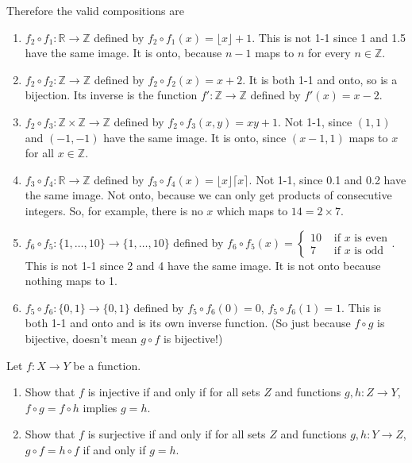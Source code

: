 \documentclass[11pt,dvipsnames]{book}
\def\R{\mathbb{R}}
\def\Z{\mathbb{Z}}
\numberwithin{figure}{section} %
\numberwithin{table}{section} %
\begin{document}
\begin{exercise}
\begin{solution}
Therefore the valid compositions are
\begin{enumerate}[label=(\alph*)]
 \item $f_2 \circ f_1 \colon \R \to \Z$ defined by $f_2 \circ f_1(x) = \lfloor x \rfloor + 1$. This is not 1-1 since 1 and 1.5 have the same image. It is onto, because $n-1$ maps to $n$ for every $n \in \Z$.
\item $f_2 \circ f_2 \colon \Z \to\Z$ defined by $f_2 \circ f_2(x) = x+2$. It is both 1-1 and onto, so is a bijection. Its inverse is the function $f'\colon \Z \to \Z$ defined by $f'(x) = x-2$.
 \item $f_2 \circ f_3 \colon \Z \times \Z \to \Z$ defined by $f_2 \circ f_3(x,y) = xy+1$. Not 1-1, since $(1,1)$ and $(-1,-1)$ have the same image. It is onto, since $(x-1,1)$ maps to $x$ for all $x \in \Z$.
 \item $f_3 \circ f_4 \colon \R \to \Z$ defined by $f_3 \circ f_4 (x) = \lfloor x \rfloor \lceil x \rceil$. Not 1-1, since 0.1 and 0.2 have the same image. Not onto, because we can only get products of consecutive integers. So, for example, there is no $x$ which maps to $14 = 2 \times 7$.
 \item $f_6 \circ f_5 \colon \{1,\dots, 10\} \to \{1,\dots, 10\}$ defined by $f_6 \circ f_5(x) = \begin{cases} 10 & \text{ if }x \text{ is even} \\7 & \text{ if }x \text{ is odd} \end{cases}$. This is not 1-1 since 2 and 4 have the same image. It is not onto because nothing maps to 1.
 \item $f_5 \circ f_6 \colon \{0,1\} \to \{0,1\}$ defined by $f_5 \circ f_6(0) = 0$, $f_5 \circ f_6(1) = 1$. This is both 1-1 and onto and is its own inverse function. (So just because $f \circ g$ is bijective, doesn't mean $g \circ f$ is bijective!)
\end{enumerate}

\end{solution}

\end{exercise}

%
%

\begin{exercise} Let $f:X\rightarrow Y$ be a function.

\begin{enumerate}[label=(\alph*)]
\item Show that $f$ is injective if and only if for all sets $Z$ and functions $g,h:Z\rightarrow Y$, $f\circ g=f\circ h$ implies $g=h$.
\item Show that $f$ is surjective if and only if for all sets $Z$ and functions $g,h:Y\rightarrow Z$, $g\circ f = h\circ f$ if and only if $g=h$.
\end{enumerate}

\end{exercise}
\end{document}
